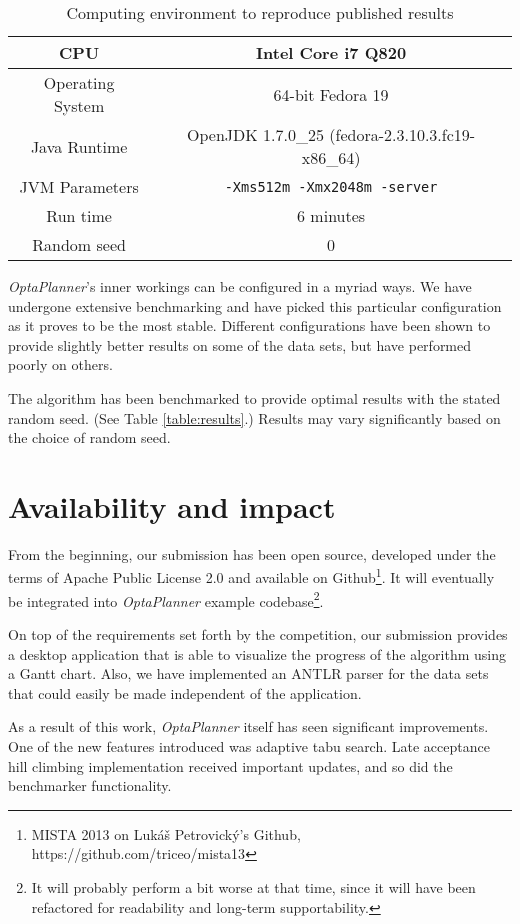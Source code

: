 \documentclass[draft]{svjour3}
\begin{document}
\begin{table}
\caption{Computing environment to reproduce published results}
\centering
\begin{tabular}{c|c}
CPU & Intel Core i7 Q820\\ 
\hline 
Operating System & 64-bit Fedora 19\\ 
\hline 
Java Runtime & OpenJDK 1.7.0\_25 (fedora-2.3.10.3.fc19-x86\_64)\\ 
\hline 
JVM Parameters & \texttt{-Xms512m -Xmx2048m -server}\\ 
\hline 
Run time & 6 minutes\\ 
\hline 
Random seed & 0
\end{tabular} 
\label{table:env}
\end{table}

\textit{OptaPlanner}'s inner workings can be configured in a myriad ways. We have undergone extensive benchmarking and have picked this particular configuration as it proves to be the most stable. Different configurations have been shown to provide slightly better results on some of the data sets, but have performed poorly on others.

The algorithm has been benchmarked to provide optimal results with the stated random seed. (See Table \ref{table:results}.) Results may vary significantly based on the choice of random seed.

\section{Availability and impact}

From the beginning, our submission has been open source, developed under the terms of Apache Public License 2.0 and available on Github\footnote{MISTA 2013 on Lukáš Petrovický's Github, https://github.com/triceo/mista13}. It will eventually be integrated into \textit{OptaPlanner} example codebase\footnote{It will probably perform a bit worse at that time, since it will have been refactored for readability and long-term supportability.}.

On top of the requirements set forth by the competition, our submission provides a desktop application that is able to visualize the progress of the algorithm using a Gantt chart. Also, we have implemented an ANTLR parser for the data sets that could easily be made independent of the application.

As a result of this work, \textit{OptaPlanner} itself has seen significant improvements. One of the new features introduced was adaptive tabu search. Late acceptance hill climbing implementation received important updates, and so did the benchmarker functionality.
\end{document}
